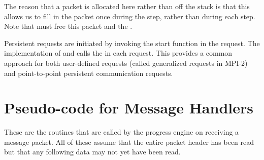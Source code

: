 \documentclass{article}
\begin{document}
The reason that a packet is allocated here rather than off the stack
is that this allows us to fill in the packet once during the
 step, rather than during each
 step.  Note that  must
free this packet and the .


Persistent requests are initiated by invoking the start function in
the request.  The implementation of  and
 calls the  in each request.  This
provides a common approach for both user-defined requests (called
generalized requests in MPI-2) and point-to-point persistent
communication requests.

\section{Pseudo-code for Message Handlers}
\label{sec:handlers}
\label{sec:agent}
These are the routines that are called by the progress engine on receiving a
message packet.  All of these assume that the entire packet header has been 
read but that any following data may not yet have been read.  
\end{document}

